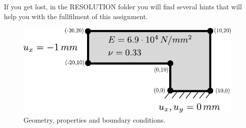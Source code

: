 \documentclass[12pt]{article}
\begin{document}
If you get lost, in the RESOLUTION folder you will find several hints that will help you with the fullfilment of this assignment.

\vspace{2cm}

\begin{figure}[htp]
\begin{center}
\includegraphics[width=1\linewidth]{Lbeam.pdf}
\caption{Geometry, properties and boundary conditions.}
\label{fig:geometry}
\end{center}
\end{figure}

\vspace{2cm}

\hrulefill


\end{document}
